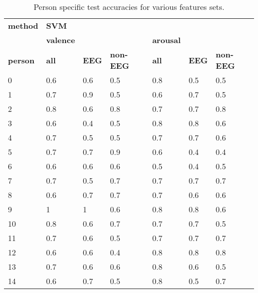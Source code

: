 \begin{table}[]
\centering
\caption{Person specific test accuracies for various features sets.}
\begin{tabular}{l|lll|lll}
\textbf{method}          & \textbf{SVM}                  &           &         &         &     &         \\
                & \textbf{valence}              &           &         & \textbf{arousal} &     &         \\
\textbf{person}          & \textbf{all}                  & \textbf{EEG}       & \textbf{non-EEG} & \textbf{all}     & \textbf{EEG} & \textbf{non-EEG} \\ \hline 
 0               & 0.6                  & 0.6       & 0.5     & 0.8     & 0.5 & 0.5     \\
1               & 0.7                  & 0.9       & 0.5     & 0.6     & 0.7 & 0.5     \\
2               & 0.8                  & 0.6       & 0.8     & 0.7     & 0.7 & 0.8     \\
3               & 0.6                  & 0.4       & 0.5     & 0.8     & 0.8 & 0.6     \\
4               & 0.7                  & 0.5       & 0.5     & 0.7     & 0.7 & 0.6     \\
5               & 0.7                  & 0.7       & 0.9     & 0.6     & 0.4 & 0.4     \\
6               & 0.6                  & 0.6       & 0.6     & 0.5     & 0.4 & 0.5     \\
7               & 0.7                  & 0.5       & 0.7     & 0.7     & 0.7 & 0.7     \\
8               & 0.6                  & 0.7       & 0.7     & 0.7     & 0.6 & 0.6     \\
9               & 1                    & 1         & 0.6     & 0.8     & 0.8 & 0.6     \\
10              & 0.8                  & 0.6       & 0.7     & 0.7     & 0.7 & 0.5     \\
11              & 0.7                  & 0.6       & 0.5     & 0.7     & 0.7 & 0.7     \\
12              & 0.6                  & 0.6       & 0.4     & 0.8     & 0.8 & 0.8     \\
13              & 0.7                  & 0.6       & 0.6     & 0.8     & 0.6 & 0.5     \\
14              & 0.6                  & 0.7       & 0.5     & 0.8     & 0.5 & 0.7     \\

\end{tabular}
\end{table}

